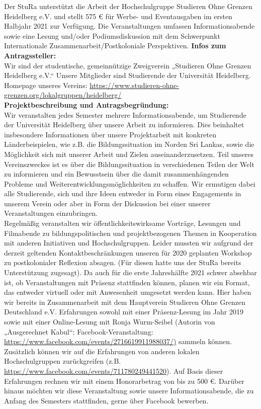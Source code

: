 {
    Der StuRa unterstützt die Arbeit der Hochschulgruppe Studieren Ohne Grenzen Heidelberg e.V. und stellt 575 € für Werbe- und Eventausgaben im ersten Halbjahr 2021 zur Verfügung. Die Veranstaltungen umfassen Informationsabende sowie eine Lesung und/oder Podiumsdiskussion mit dem Schwerpunkt Internationale Zusammenarbeit/Postkoloniale Perspektiven.
}{
    \textbf{Infos zum Antragssteller:}\\
    Wir sind der studentische, gemeinnützige Zweigverein „Studieren Ohne Grenzen Heidelberg e.V.“ Unsere Mitglieder sind Studierende der Universität Heidelberg.\\
    Homepage unseres Vereins: \url{https://www.studieren-ohne-grenzen.org/lokalgruppen/heidelberg/}\\[1em]
    \textbf{Projektbeschreibung und Antragsbegründung:}\\
    Wir veranstalten jedes Semester mehrere Informationsabende, um Studierende der Universität Heidelberg über unsere Arbeit zu informieren. Dies beinhaltet insbesondere Informationen über unsere Projektarbeit mit konkreten Länderbeispielen, wie z.B. die Bildungssituation im Norden Sri Lankas, sowie die Möglichkeit sich mit unserer Arbeit und Zielen auseinanderzusetzen. Teil unseres Vereinszweckes ist es über die Bildungssituation in verschiedenen Teilen der Welt zu informieren und ein Bewusstsein über die damit zusammenhängenden Probleme und Weiterentwicklungsmöglichkeiten zu schaffen. Wir ermutigen dabei alle Studierende, sich und ihre Ideen entweder in Form eines Engagements in unserem Verein oder aber in Form der Diskussion bei einer unserer Veranstaltungen einzubringen.\\
    Regelmäßig veranstalten wir öffentlichkeitswirksame Vorträge, Lesungen und Filmabende zu bildungspolitischen und projektbezogenen Themen in Kooperation mit anderen Initiativen und Hochschulgruppen. Leider mussten wir aufgrund der derzeit geltenden Kontaktbeschränkungen unseren für 2020 geplanten Workshop zu postkolonialer Reflexion absagen. (Für diesen hatte uns der StuRa bereits Unterstützung zugesagt). Da auch für die erste Jahreshälfte 2021 schwer absehbar ist, ob Veranstaltungen mit Präsenz stattfinden können, planen wir ein Format, das entweder virtuell oder mit Anwesenheit umgesetzt werden kann. Hier haben wir bereits in Zusammenarbeit mit dem Hauptverein Studieren Ohne Grenzen Deutschland e.V. Erfahrungen sowohl mit einer Präsenz-Lesung im Jahr 2019 sowie mit einer Online-Lesung mit Ronja Wurm-Seibel (Autorin von „Ausgerechnet Kabul“; Facebook-Veranstaltung: \url{https://www.facebook.com/events/2716619911988037/)} sammeln können. Zusätzlich können wir auf die Erfahrungen von anderen lokalen Hochschulgruppen zurückgreifen (z.B. \url{https://www.facebook.com/events/711780249441520}). Auf Basis dieser Erfahrungen rechnen wir mit einem Honorarbetrag von bis zu 500 €. Darüber hinaus möchten wir diese Veranstaltung sowie unsere Informationsabende, die zu Anfang des Semesters stattfinden, gerne über Facebook bewerben.\\
}
